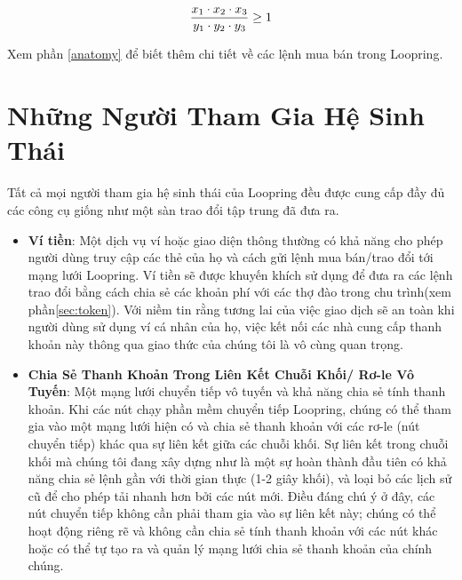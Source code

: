 \documentclass{article}
\begin{document}
\begin{multicols}{2}
\begin{equation}
{{x_1 \cdot x_2 \cdot x_3 \over y_1 \cdot y_2 \cdot y_3} \geq 1}
\end{equation}


Xem phần \ref{anatomy} để biết thêm chi tiết về các lệnh mua bán trong Loopring.



\section{Những Người Tham Gia Hệ Sinh Thái\label{sec:ecosystem}}
Tất cả mọi người tham gia hệ sinh thái của Loopring đều được cung cấp đầy đủ các công cụ giống như một sàn trao đổi tập trung đã đưa ra. 

\begin{itemize}

\item \textbf{Ví tiền}: Một dịch vụ ví hoặc giao diện thông thường có khả năng cho phép người dùng truy cập các thẻ của họ và cách gửi lệnh mua bán/trao đổi tới mạng lưới Loopring. Ví tiền sẽ được khuyến khích sử dụng để đưa ra các lệnh trao đổi bằng cách chia sẻ các khoản phí với các thợ đào trong chu trình(xem phần\ref{sec:token}). Với niềm tin rằng tương lai của việc giao dịch sẽ an toàn khi người dùng sử dụng ví cá nhân của họ, việc kết nối các nhà cung cấp thanh khoản này thông qua giao thức của chúng tôi là vô cùng quan trọng.

\item \textbf{Chia Sẻ Thanh Khoản Trong Liên Kết Chuỗi Khối/ Rơ-le Vô Tuyến}: Một mạng lưới chuyển tiếp vô tuyến và khả năng chia sẻ tính thanh khoản. Khi các nút chạy phần mềm chuyển tiếp Loopring, chúng có thể tham gia vào một mạng lưới hiện có và chia sẻ thanh khoản với các rơ-le (nút chuyển tiếp) khác qua sự liên kết giữa các chuỗi khối. Sự liên kết trong chuỗi khối mà chúng tôi đang xây dựng như là một sự hoàn thành đầu tiên có khả năng chia sẻ lệnh gần với thời gian thực (1-2 giây khối), và loại bỏ các lịch sử cũ để cho phép tải nhanh hơn bởi các nút mới. Điều đáng chú ý ở đây, các nút chuyển tiếp không cần phải tham gia vào sự liên kết này; chúng có thể hoạt động riêng rẽ và không cần chia sẻ tính thanh khoản với các nút khác hoặc có thể tự tạo ra và quản lý mạng lưới chia sẻ thanh khoản của chính chúng.


\end{itemize}
\end{multicols}
\end{document}
